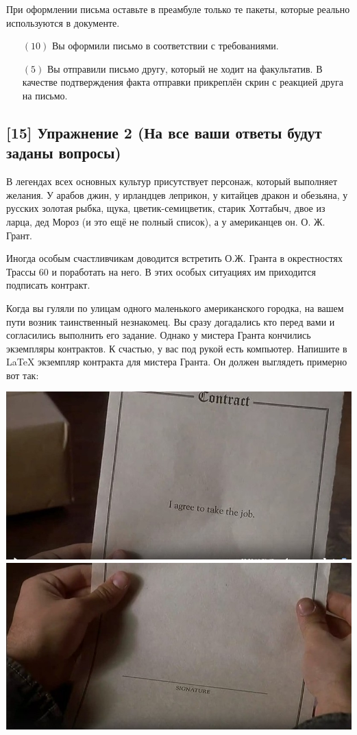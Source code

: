 \documentclass[12pt, a4paper, oneside]{article}
\begin{document}
При оформлении письма оставьте в преамбуле только те пакеты, которые реально используются в документе.

\begin{itemize}
\item[$(10)$] Вы оформили письмо в соответствии с требованиями.

\item[$(5)$] Вы отправили письмо другу, который не ходит на факультатив. В качестве подтверждения факта отправки прикреплён скрин с реакцией друга на письмо.
\end{itemize}

\subsection*{[15]  Упражнение 2 (На все ваши ответы будут заданы вопросы)}

В легендах всех основных культур присутствует персонаж, который выполняет желания. У арабов джин, у ирландцев леприкон, у китайцев дракон и обезьяна, у русских золотая рыбка, щука, цветик-семицветик, старик Хоттабыч, двое из ларца, дед Мороз (и это ещё не полный список), а у американцев он. О. Ж. Грант.

Иногда особым счастливчикам доводится встретить О.Ж. Гранта в окрестностях Трассы 60 и поработать на него. В этих особых ситуациях им приходится подписать контракт.

Когда вы гуляли по улицам одного маленького американского городка, на вашем пути возник таинственный незнакомец. Вы сразу догадались кто перед вами и согласились выполнить его задание. Однако у мистера Гранта кончились экземпляры контрактов. К счастью, у вас под рукой есть компьютер. Напишите в \LaTeX{} экземпляр контракта для мистера Гранта. Он должен выглядеть примерно вот так:

\begin{center}
	\includegraphics[scale=0.4]{Hg91uSv1cik.jpg}
	\includegraphics[scale=0.4]{t_XxgIqEmBE.jpg}
\end{center} 
\end{document}
